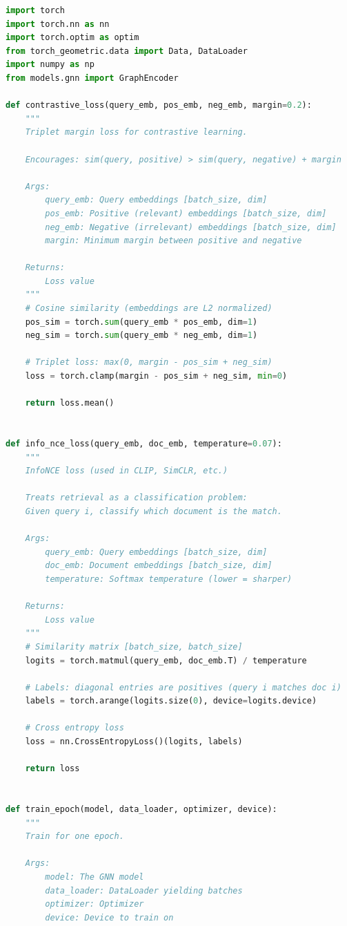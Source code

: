 \documentclass[12pt,a4paper]{article}
\begin{document}
\begin{lstlisting}[language=Python,caption={train.py}]
import torch
import torch.nn as nn
import torch.optim as optim
from torch_geometric.data import Data, DataLoader
import numpy as np
from models.gnn import GraphEncoder

def contrastive_loss(query_emb, pos_emb, neg_emb, margin=0.2):
    """
    Triplet margin loss for contrastive learning.

    Encourages: sim(query, positive) > sim(query, negative) + margin

    Args:
        query_emb: Query embeddings [batch_size, dim]
        pos_emb: Positive (relevant) embeddings [batch_size, dim]
        neg_emb: Negative (irrelevant) embeddings [batch_size, dim]
        margin: Minimum margin between positive and negative

    Returns:
        Loss value
    """
    # Cosine similarity (embeddings are L2 normalized)
    pos_sim = torch.sum(query_emb * pos_emb, dim=1)
    neg_sim = torch.sum(query_emb * neg_emb, dim=1)

    # Triplet loss: max(0, margin - pos_sim + neg_sim)
    loss = torch.clamp(margin - pos_sim + neg_sim, min=0)

    return loss.mean()


def info_nce_loss(query_emb, doc_emb, temperature=0.07):
    """
    InfoNCE loss (used in CLIP, SimCLR, etc.)

    Treats retrieval as a classification problem:
    Given query i, classify which document is the match.

    Args:
        query_emb: Query embeddings [batch_size, dim]
        doc_emb: Document embeddings [batch_size, dim]
        temperature: Softmax temperature (lower = sharper)

    Returns:
        Loss value
    """
    # Similarity matrix [batch_size, batch_size]
    logits = torch.matmul(query_emb, doc_emb.T) / temperature

    # Labels: diagonal entries are positives (query i matches doc i)
    labels = torch.arange(logits.size(0), device=logits.device)

    # Cross entropy loss
    loss = nn.CrossEntropyLoss()(logits, labels)

    return loss


def train_epoch(model, data_loader, optimizer, device):
    """
    Train for one epoch.

    Args:
        model: The GNN model
        data_loader: DataLoader yielding batches
        optimizer: Optimizer
        device: Device to train on


\end{lstlisting}
\end{document}
